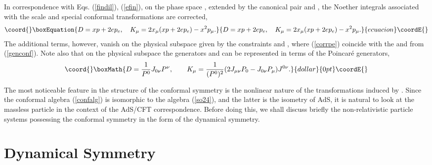 \documentclass[a4paper,12pt]{article}
\begin{document}
In correspondence
with Eqs. (\ref{findil}), (\ref{efin}),
on the phase space
\coordHE{}, \coordHE{}
extended by the canonical pair
\coordHE{} and \coordHE{},
the Noether integrals associated with the
scale and special conformal transformations
are corrected,
\begin{equation}\coord{}\boxEquation{
D=xp+2ep_e,\quad K_\mu=2x_{\mu }(xp+2ep_e)-x^{2}p_{\mu }.
\label{corrpe}
}{
D=xp+2ep_e,\quad K_\mu=2x_{\mu }(xp+2ep_e)-x^{2}p_{\mu }.
}{ecuacion}\coordE{}\end{equation}
The additional terms, however, vanish on the physical
subspace given
by the constraints
\coordHE{} and  \coordHE{},
where (\ref{corrpe}) coincide with the \coordHE{} and \coordHE{} from
(\ref{genconf}).
Note also that on the physical subspace
the generators \coordHE{} and \coordHE{}
can be represented in terms of the Poincar\'e generators,
$$\coord{}\boxMath{
D=\frac{1}{P^0}J_{0\nu}P^\nu,\qquad
K_\mu=\frac{1}{(P^0)^2}(2J_{\mu\nu}P_0-
J_{0\nu}P_\mu)J^{0\nu}.
}{dollar}{0pt}\coordE{}$$


The most noticeable feature
in the structure of the
conformal symmetry
is the nonlinear nature of the
transformations
induced by \coordHE{}.
Since the conformal algebra (\ref{confalg})
is isomorphic to the \coordHE{} algebra
(\ref{so24}), and
the latter is the
isometry of AdS\coordHE{},
it is natural to
look at the massless particle
in the context of the AdS/CFT
correspondence.
Before doing this, we shall discuss
briefly the non-relativistic
particle systems possessing the conformal symmetry
\coordHE{} in the form of the
dynamical symmetry.


\section{Dynamical \coordHE{} Symmetry}
\end{document}
